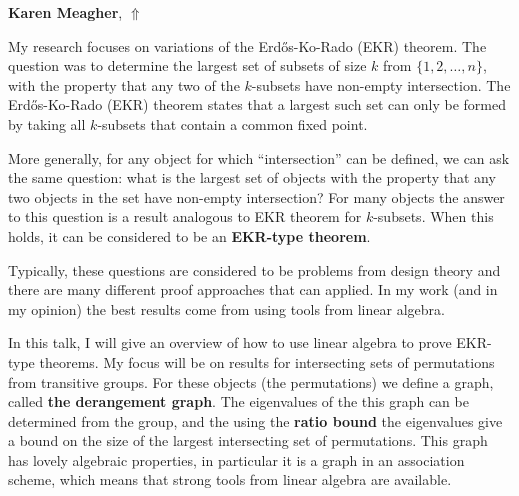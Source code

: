 \documentclass[ILAS2025-program.tex]{subfiles}
\begin{document}
\hypertarget{down0007}{}\begin{ilasabstract}
    
\textbf{Karen Meagher},  \hfill \hyperlink{up0007}{$\Uparrow$}
    
    
\mtskip
    My research focuses on variations of the Erd\H{o}s-Ko-Rado (EKR) theorem. The question was to determine the largest set of subsets of size $k$ from $\{1,2,\dots,n\}$, with the property that any two of the $k$-subsets have non-empty intersection. The Erd\H{o}s-Ko-Rado (EKR) theorem states that a largest such set can only be formed by taking all $k$-subsets that contain a common fixed point.

More generally, for any object for which ``intersection'' can be defined, we can ask the same question: what is the largest set of objects with the property that any two objects in the set have non-empty intersection? For many objects the answer to this question is a result analogous to EKR theorem for $k$-subsets. When this holds, it can be considered to be an \textbf{EKR-type theorem}.

Typically, these questions are considered to be problems from design theory and there are many different proof approaches that can applied. In my work (and in my opinion) the best results come from using tools from linear algebra. 

In this talk, I will give an overview of how to use linear algebra to prove EKR-type theorems. My focus will be on results for intersecting sets of permutations from transitive groups. For these objects (the permutations) we define a graph, called \textbf{the derangement graph}. The eigenvalues of the this graph can be determined from the group, and the using the \textbf{ratio bound} the eigenvalues give a bound on the size of the largest intersecting set of permutations. This graph has lovely algebraic properties, in particular it is a graph in an association scheme, which means that strong tools from linear algebra are available.

\end{ilasabstract}
    
\end{document}
